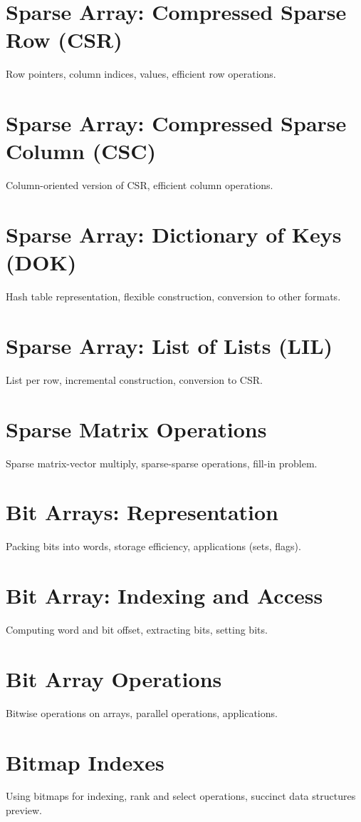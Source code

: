 \chapter{Sparse Array: Compressed Sparse Row (CSR)}
Row pointers, column indices, values, efficient row operations.

\chapter{Sparse Array: Compressed Sparse Column (CSC)}
Column-oriented version of CSR, efficient column operations.

\chapter{Sparse Array: Dictionary of Keys (DOK)}
Hash table representation, flexible construction, conversion to other formats.

\chapter{Sparse Array: List of Lists (LIL)}
List per row, incremental construction, conversion to CSR.

\chapter{Sparse Matrix Operations}
Sparse matrix-vector multiply, sparse-sparse operations, fill-in problem.

\chapter{Bit Arrays: Representation}
Packing bits into words, storage efficiency, applications (sets, flags).

\chapter{Bit Array: Indexing and Access}
Computing word and bit offset, extracting bits, setting bits.

\chapter{Bit Array Operations}
Bitwise operations on arrays, parallel operations, applications.

\chapter{Bitmap Indexes}
Using bitmaps for indexing, rank and select operations, succinct data structures preview.

